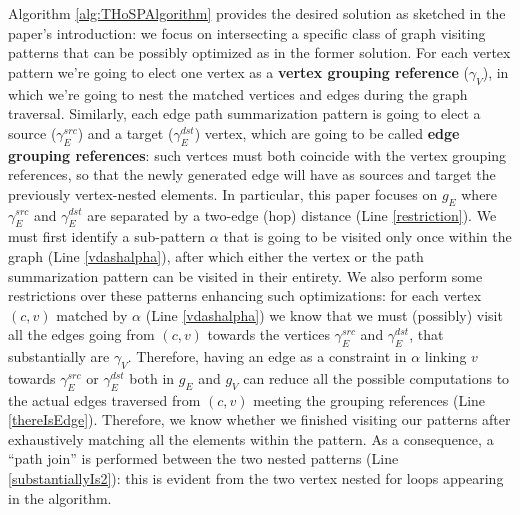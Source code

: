 Algorithm \ref{alg:THoSPAlgorithm} provides the desired solution as sketched in the paper's introduction: we focus on intersecting a specific class of graph visiting patterns that can be possibly optimized as in the former solution. For each vertex pattern we're going to elect one vertex as a \textbf{vertex grouping reference} ($\gamma_V$), in which we're going to nest the matched vertices and edges  during the graph traversal. Similarly, each edge path summarization pattern is going to elect a source ($\gamma_E^{src}$) and a target ($\gamma_E^{dst}$) vertex, which are going to be called \textbf{edge grouping references}: such vertces must both coincide with the vertex grouping references, so that the newly generated edge will have as sources and target the previously vertex-nested elements. In particular, this paper focuses on $g_E$ where $\gamma_E^{src}$  and $\gamma_E^{dst}$ are separated by a two-edge (hop) distance
(Line \ref{restriction}). We must first identify a sub-pattern $\alpha$ that is going to be visited only once within the graph (Line \ref{vdashalpha}), after which either the vertex or the path summarization pattern can be visited in their entirety. We also perform some restrictions over these patterns enhancing such optimizations: for each vertex $(c,v)$ matched by $\alpha$ (Line \ref{vdashalpha}) we know that we must (possibly) visit all the edges going from $(c,v)$ towards the vertices $\gamma_E^{src}$ and $\gamma_E^{dst}$, that substantially are $\gamma_V$.  Therefore, having an edge as a constraint in $\alpha$ linking $v$ towards $\gamma_E^{src}$ or $\gamma_E^{dst}$ both in $g_E$ and $g_V$ can reduce all the possible computations to the actual edges traversed from $(c,v)$ meeting the grouping references (Line \ref{thereIsEdge}). Therefore, we know whether we finished visiting our patterns after exhaustively matching all the elements within the pattern.
As a consequence, a ``path join'' is performed between the two nested patterns (Line \ref{substantiallyIs2}): this is evident from the two vertex nested for loops appearing in the algorithm.  %


